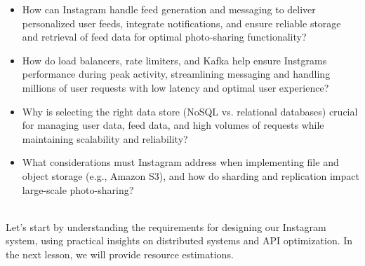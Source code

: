 \begin{itemize}
\item
How can Instagram handle feed generation and messaging to deliver personalized user feeds, integrate notifications, and ensure reliable storage and retrieval of feed data for optimal photo-sharing functionality?
\item
How do load balancers, rate limiters, and Kafka help ensure Instgram\textquotesingle s performance during peak activity, streamlining messaging and handling millions of user requests with low latency and optimal user experience?
\item
Why is selecting the right data store (NoSQL vs. relational databases) crucial for managing user data, feed data, and high volumes of requests while maintaining scalability and reliability?
\item
What considerations must Instagram address when implementing file and object storage (e.g., Amazon S3), and how do sharding and replication impact large-scale photo-sharing?
\end{itemize}
\\
Let's start by understanding the requirements for designing our Instagram system, using practical insights on distributed systems and API optimization. In the next lesson, we will provide resource estimations.


